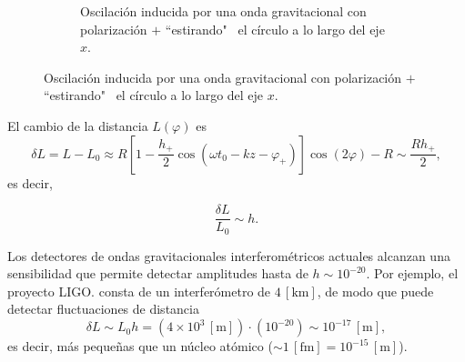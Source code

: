 \documentclass[letterpaper,11pt]{article}
\begin{document}
\begin{figure}
\begin{subfigure}[t]{0.4\textwidth}
        \caption{Oscilación inducida por una onda gravitacional con polarización $+$ ``estirando" \ el círculo a lo largo del eje $x$.}
        \label{fig:Efecto-GW-4}
    \end{subfigure}
\end{figure}

El cambio de la distancia $L(\varphi)$ es
\begin{equation}
\delta L = L - L_0 \approx R\left[1 - \frac{h_{+}}{2} \cos(\omega t_{0} - kz - \varphi_{+} ) \right] \cos(2\varphi) - R \sim \frac{R h_{+}}{2},
\end{equation}
es decir,
\begin{shaded}
\begin{equation}
\frac{\delta L}{L_0} \sim h.
\end{equation}
\end{shaded}

Los detectores de ondas gravitacionales interferométricos actuales alcanzan una sensibilidad que permite detectar amplitudes hasta de $h \sim 10^{-20}$. Por ejemplo, el proyecto LIGO. consta de un interferómetro de $4 \,[\text{km}]$, de modo que puede detectar fluctuaciones de distancia
\begin{equation}
\delta L \sim L_0 h = (4 \times 10^{3} \,[\text{m}]) \cdot (10^{-20}) \sim 10^{-17} \,[\text{m}],
\end{equation}
es decir, más pequeñas que un núcleo atómico ($\sim 1 \,[\text{fm}] = 10^{-15}\,[\text{m}] $).
\end{document}
